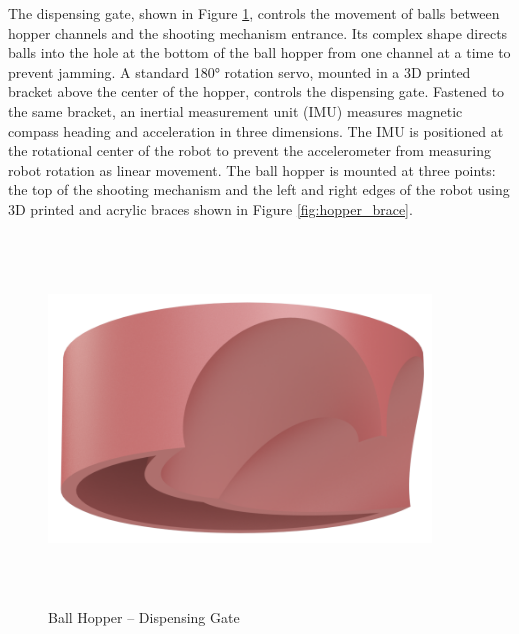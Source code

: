 The dispensing gate, shown in Figure \ref{fig:dispensing_gate}, controls the movement of balls between hopper channels and the shooting mechanism entrance. Its complex shape directs balls into the hole at the bottom of the ball hopper from one channel at a time to prevent jamming. A standard \ang{180} rotation servo, mounted in a 3D printed bracket above the center of the hopper, controls the dispensing gate.  Fastened to the same bracket, an inertial measurement unit (IMU) measures magnetic compass heading and acceleration in three dimensions. The IMU is positioned at the rotational center of the robot to prevent the accelerometer from measuring robot rotation as linear movement. The ball hopper is mounted at three points: the top of the shooting mechanism and the left and right edges of the robot using 3D printed and acrylic braces shown in Figure \ref{fig:hopper_brace}. 
\begin{figure}[H]   %
	\centering \includegraphics[width=4in, height=3.85in, keepaspectratio]{figures/dispensing_gate.png}
	\caption{Ball Hopper -- Dispensing Gate}	\label{fig:dispensing_gate}
\end{figure}
